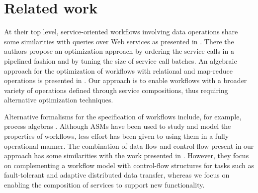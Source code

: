 
\section{Related work} \label{sec:relatedwork}

At their top level, service-oriented workflows involving data operations share some similarities with queries over Web services as presented in \cite{Srivastava:2006:QOO:1182635.1164159}. There the authors propose an optimization approach by ordering the service calls in a pipelined fashion and by tuning the size of service call batches. An algebraic approach for the optimization of workflows with relational and map-reduce operations is presented in \cite{DBLP:journals/pvldb/OgasawaraOVDPM11}. Our approach is to enable workflows with a broader variety of operations defined through service compositions, thus requiring alternative optimization techniques.

Alternative formalisms for the specification of workflows include, for example, process algebras \cite{Curcin:2011:STW:2048456.2048467}. Although ASMs have been used to study and model the properties of workflows, less effort has been given to using them in a fully operational manner. The combination of data-flow and control-flow present in our approach has some similarities with the work presented in \cite{Bowers:2006:ESR:1129755.1130113}. However, they focus on complementing a workflow model with control-flow structures for tasks such as fault-tolerant and adaptive distributed data transfer, whereas we focus on enabling the composition of services to support new functionality.

